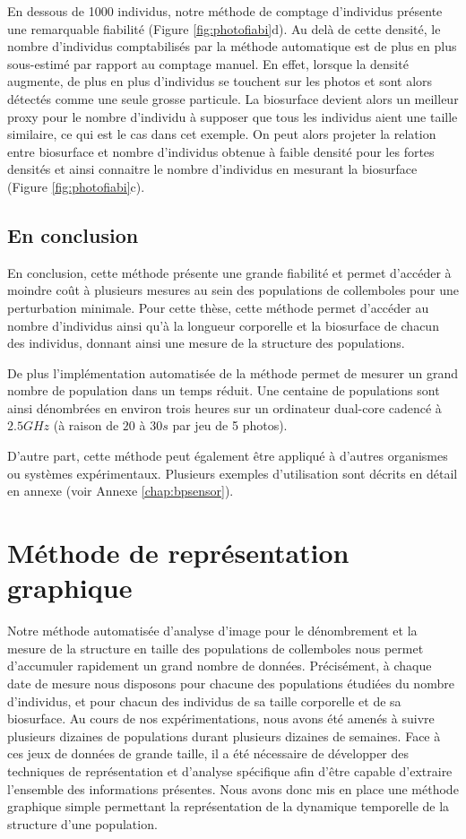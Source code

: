 En dessous de 1000 individus, notre méthode de comptage d'individus présente une
remarquable fiabilité (Figure \ref{fig:photofiabi}d). Au delà de cette densité,
le nombre d'individus comptabilisés par la méthode automatique est de plus en
plus sous-estimé par rapport au comptage manuel. En effet, lorsque la densité
augmente, de plus en plus d'individus se touchent sur les photos et sont alors
détectés comme une seule grosse particule. La biosurface devient alors un
meilleur proxy pour le nombre d'individu à supposer que tous les individus aient
une taille similaire, ce qui est le cas dans cet exemple. On peut alors projeter
la relation entre biosurface et nombre d'individus obtenue à faible densité pour
les fortes densités et ainsi connaitre le nombre d'individus en mesurant la
biosurface (Figure \ref{fig:photofiabi}c).

\subsection{En conclusion}

En conclusion, cette méthode présente une grande fiabilité et permet d'accéder à
moindre coût à plusieurs mesures au sein des populations de collemboles pour une
perturbation minimale. Pour cette thèse, cette méthode permet d'accéder au
nombre d'individus ainsi qu'à la longueur corporelle et la biosurface de chacun
des individus, donnant ainsi une mesure de la structure des populations. 

De plus l'implémentation automatisée de la méthode permet de mesurer un grand
nombre de population dans un temps réduit. Une centaine de populations sont
ainsi dénombrées en environ trois heures sur un ordinateur dual-core cadencé à
$2.5GHz$ (à raison de $20$ à $30s$ par jeu de 5 photos).

D'autre part, cette méthode peut également être appliqué à d'autres organismes
ou systèmes expérimentaux. Plusieurs exemples d'utilisation sont décrits en
détail en annexe (voir Annexe \ref{chap:bpsensor}).

\section{Méthode de représentation graphique}\label{sec:stdiag}

Notre méthode automatisée d'analyse d'image pour le dénombrement et la mesure de
la structure en taille des populations de collemboles nous permet d'accumuler
rapidement un grand nombre de données. Précisément, à chaque date de mesure nous
disposons pour chacune des populations étudiées du nombre d'individus, et pour
chacun des individus de sa taille corporelle et de sa biosurface. Au cours
de nos expérimentations, nous avons été amenés à suivre plusieurs dizaines de
populations durant plusieurs dizaines de semaines. Face à ces jeux de données de
grande taille, il a été nécessaire de développer des techniques de
représentation et d'analyse spécifique afin d'être capable d'extraire l'ensemble
des informations présentes. Nous avons donc mis en place une méthode graphique
simple permettant la représentation de la dynamique temporelle de la structure
d'une population. 

